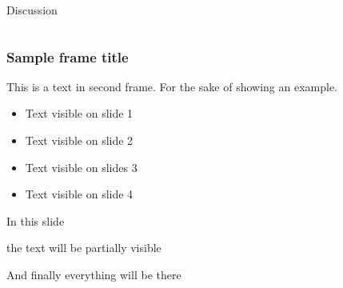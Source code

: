 \documentclass[8pt]{beamer}
\begin{document}
	\begin{frame}{Discussion}
		\begin{columns}
			
			
			
			
		\end{columns}
	\end{frame}
	\begin{frame}
	\end{frame}
	\begin{frame}
	\end{frame}
	\begin{frame}
	\end{frame}
	\begin{frame}
		\frametitle{Sample frame title}
		This is a text in second frame. For the sake of showing an example.
		
		\begin{itemize}
			\item<1-> Text visible on slide 1
			\item<2-> Text visible on slide 2
			\item<3> Text visible on slides 3
			\item<4-> Text visible on slide 4
		\end{itemize}
	\end{frame}
	
	
	
	\begin{frame}
		In this slide \pause
		
		the text will be partially visible \pause
		
		And finally everything will be there
	\end{frame}
	
\end{document}
